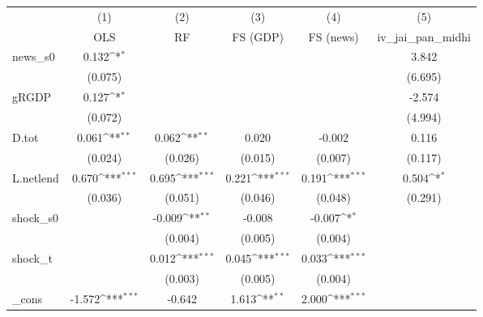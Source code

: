 {
\def\sym#1{\ifmmode^{#1}\else\(^{#1}\)\fi}
\begin{tabular}{l*{5}{c}}
\toprule
            &\multicolumn{1}{c}{(1)}&\multicolumn{1}{c}{(2)}&\multicolumn{1}{c}{(3)}&\multicolumn{1}{c}{(4)}&\multicolumn{1}{c}{(5)}\\
            &\multicolumn{1}{c}{OLS}&\multicolumn{1}{c}{RF}&\multicolumn{1}{c}{FS (GDP)}&\multicolumn{1}{c}{FS (news)}&\multicolumn{1}{c}{iv\_jai\_pan\_midhi}\\
\midrule
news\_s0     &       0.132\sym{*}  &                     &                     &                     &       3.842         \\
            &     (0.075)         &                     &                     &                     &     (6.695)         \\
\addlinespace
gRGDP       &       0.127\sym{*}  &                     &                     &                     &      -2.574         \\
            &     (0.072)         &                     &                     &                     &     (4.994)         \\
\addlinespace
D.tot       &       0.061\sym{**} &       0.062\sym{**} &       0.020         &      -0.002         &       0.116         \\
            &     (0.024)         &     (0.026)         &     (0.015)         &     (0.007)         &     (0.117)         \\
\addlinespace
L.netlend   &       0.670\sym{***}&       0.695\sym{***}&       0.221\sym{***}&       0.191\sym{***}&       0.504\sym{*}  \\
            &     (0.036)         &     (0.051)         &     (0.046)         &     (0.048)         &     (0.291)         \\
\addlinespace
shock\_s0    &                     &      -0.009\sym{**} &      -0.008         &      -0.007\sym{*}  &                     \\
            &                     &     (0.004)         &     (0.005)         &     (0.004)         &                     \\
\addlinespace
shock\_t     &                     &       0.012\sym{***}&       0.045\sym{***}&       0.033\sym{***}&                     \\
            &                     &     (0.003)         &     (0.005)         &     (0.004)         &                     \\
\addlinespace
\_cons      &      -1.572\sym{***}&      -0.642         &       1.613\sym{**} &       2.000\sym{***}&                     \\

\end{tabular}}

